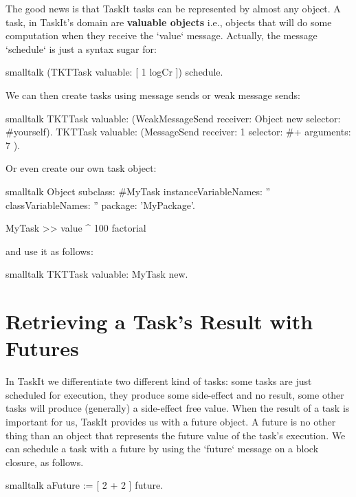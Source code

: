\documentclass[10pt,twoside,english]{_support/latex/sbabook/sbabook}
\begin{document}
The good news is that TaskIt tasks can be represented by almost any object. A task, in TaskIt's domain are \textbf{valuable objects} i.e., objects that will do some computation when they receive the `value` message. Actually, the message `schedule` is just a syntax sugar for:

\begin{displaycode}{smalltalk}
(TKTTask valuable: [ 1 logCr ]) schedule.
\end{displaycode}

We can then create tasks using message sends or weak message sends:

\begin{displaycode}{smalltalk}
TKTTask valuable: (WeakMessageSend receiver: Object new selector: #yourself).
TKTTask valuable: (MessageSend receiver: 1 selector: #+ arguments: { 7 }).
\end{displaycode}

Or even create our own task object:

\begin{displaycode}{smalltalk}
Object subclass: #MyTask
	instanceVariableNames: ''
	classVariableNames: ''
	package: 'MyPackage'.

MyTask >> value
    ^ 100 factorial
\end{displaycode}

and use it as follows:

\begin{displaycode}{smalltalk}
TKTTask valuable: MyTask new.
\end{displaycode}
\chapter{Retrieving a Task's Result with Futures}
In TaskIt we differentiate two different kind of tasks: some tasks are just scheduled for execution, they produce some side-effect and no result, some other tasks will produce (generally) a side-effect free value. When the result of a task is important for us, TaskIt provides us with a future object. A future is no other thing than an object that represents the future value of the task's execution. We can schedule a task with a future by using the `future` message on a block closure, as follows.

\begin{displaycode}{smalltalk}
aFuture := [ 2 + 2 ] future.
\end{displaycode}
\end{document}
